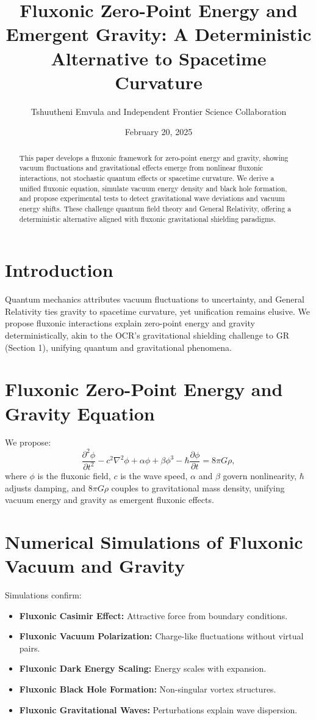 \documentclass{article}
\title{Fluxonic Zero-Point Energy and Emergent Gravity: A Deterministic Alternative to Spacetime Curvature}
\author{Tshuutheni Emvula and Independent Frontier Science Collaboration} %
\date{February 20, 2025}
\begin{document}
\maketitle

\begin{abstract}
This paper develops a fluxonic framework for zero-point energy and gravity, showing vacuum fluctuations and gravitational effects emerge from nonlinear fluxonic interactions, not stochastic quantum effects or spacetime curvature. We derive a unified fluxonic equation, simulate vacuum energy density and black hole formation, and propose experimental tests to detect gravitational wave deviations and vacuum energy shifts. These challenge quantum field theory and General Relativity, offering a deterministic alternative aligned with fluxonic gravitational shielding paradigms.
\end{abstract}

\section{Introduction}
Quantum mechanics attributes vacuum fluctuations to uncertainty, and General Relativity ties gravity to spacetime curvature, yet unification remains elusive. We propose fluxonic interactions explain zero-point energy and gravity deterministically, akin to the OCR’s gravitational shielding challenge to GR (Section 1), unifying quantum and gravitational phenomena.

\section{Fluxonic Zero-Point Energy and Gravity Equation}
We propose:
\begin{equation}
\frac{\partial^2 \phi}{\partial t^2} - c^2 \nabla^2 \phi + \alpha \phi + \beta \phi^3 - \hbar \frac{\partial \phi}{\partial t} = 8 \pi G \rho,
\end{equation}
where \(\phi\) is the fluxonic field, \(c\) is the wave speed, \(\alpha\) and \(\beta\) govern nonlinearity, \(\hbar\) adjusts damping, and \(8 \pi G \rho\) couples to gravitational mass density, unifying vacuum energy and gravity as emergent fluxonic effects.

\section{Numerical Simulations of Fluxonic Vacuum and Gravity}
Simulations confirm:
\begin{itemize}
    \item \textbf{Fluxonic Casimir Effect:} Attractive force from boundary conditions.
    \item \textbf{Fluxonic Vacuum Polarization:} Charge-like fluctuations without virtual pairs.
    \item \textbf{Fluxonic Dark Energy Scaling:} Energy scales with expansion.
    \item \textbf{Fluxonic Black Hole Formation:} Non-singular vortex structures.
    \item \textbf{Fluxonic Gravitational Waves:} Perturbations explain wave dispersion.
\end{itemize}
\end{document}
